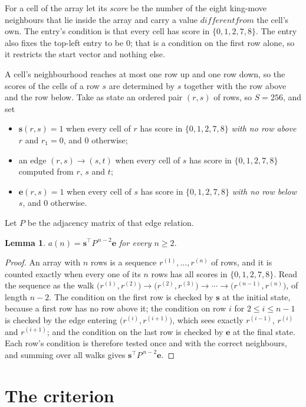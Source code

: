 \documentclass[11pt,a4paper]{article}
\theoremstyle{plain}
\newtheorem{lemma}[theorem]{Lemma}
\theoremstyle{definition}
\begin{document}
For a cell of the array let its \emph{score} be the number of the eight king-move neighbours that lie inside
the array and carry a value $different from$ the cell's own. The entry's condition is that every cell
has score in $\{0,1,2,7,8\}$. The entry also fixes the top-left entry to be $0$; that is a condition on the first row alone, so it restricts the start vector and nothing else.

A cell's neighbourhood reaches at most one row up and one row down, so the scores of the
cells of a row $s$ are determined by $s$ together with the row above and the row below.
Take as state an ordered pair $(r,s)$ of rows, so $S=256$, and set
\begin{itemize}
\item $\mathbf{s}(r,s)=1$ when every cell of $r$ has score in $\{0,1,2,7,8\}$ \emph{with no row
above $r$} and $r_1=0$, and $0$ otherwise;
\item an edge $(r,s)\to(s,t)$ when every cell of $s$ has score in $\{0,1,2,7,8\}$ computed from
$r$, $s$ and $t$;
\item $\mathbf{e}(r,s)=1$ when every cell of $s$ has score in $\{0,1,2,7,8\}$ \emph{with no row
below $s$}, and $0$ otherwise.
\end{itemize}
Let $P$ be the adjacency matrix of that edge relation.

\begin{lemma}\label{lem:walk}
$a(n)=\mathbf{s}^{\!\top}P^{\,n-2}\mathbf{e}$ for every $n\ge2$.
\end{lemma}

\begin{proof}
An array with $n$ rows is a sequence $r^{(1)},\dots,r^{(n)}$ of rows, and it is counted
exactly when every one of its $n$ rows has all scores in $\{0,1,2,7,8\}$. Read the sequence as the
walk $\bigl(r^{(1)},r^{(2)}\bigr)\to\bigl(r^{(2)},r^{(3)}\bigr)\to\cdots\to
\bigl(r^{(n-1)},r^{(n)}\bigr)$, of length $n-2$. The condition on the first row is
checked by $\mathbf{s}$ at the initial state, because a first row has no row above it; the
condition on row $i$ for $2\le i\le n-1$ is checked by the edge entering
$\bigl(r^{(i)},r^{(i+1)}\bigr)$, which sees exactly $r^{(i-1)}$, $r^{(i)}$ and
$r^{(i+1)}$; and the condition on the last row is checked by $\mathbf{e}$ at the final
state. Each row's condition is therefore tested once and with the correct neighbours, and
summing over all walks gives $\mathbf{s}^{\!\top}P^{\,n-2}\mathbf{e}$.
\end{proof}

\section{The criterion}
\end{document}
